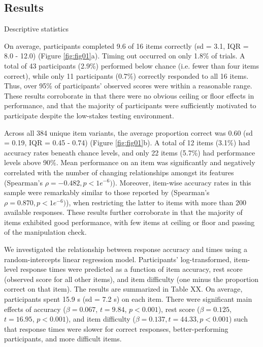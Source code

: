 \documentclass[a4paper,man,natbib]{apa6}
\makeatletter
\renewcommand{\subsubsection}{\@startsection{subsubsection}{3}
  {\z@}%
  {\b@level@two@skip}{\e@level@two@skip}%
  {\normalfont\normalsize\bfseries}}
\makeatother
\begin{document}
\subsection{Results}

\subsubsection{Descriptive statistics}

On average, participants completed 9.6 of 16 items correctly (sd = 3.1, IQR = 8.0 - 12.0) (Figure \ref{fig:fig01}a). Timing out occurred on only 1.8\% of trials. A total of 43 participants (2.9\%) performed below chance (i.e. fewer than four items correct), while only 11 participants (0.7\%) correctly responded to all 16 items. Thus, over 95\% of participants' observed scores were within a reasonable range. These results corroborate \cite{chierchia2019matrix} in that there were no obvious ceiling or floor effects in performance, and that the majority of participants were sufficiently motivated to participate despite the low-stakes testing environment.  

Across all 384 unique item variants, the average proportion correct was 0.60 (sd = 0.19, IQR = 0.45 - 0.74) (Figure \ref{fig:fig01}b). A total of 12 items (3.1\%) had accuracy rates beneath chance levels, and only 22 items (5.7\%) had performance levels above 90\%. Mean performance on an item was significantly and negatively correlated with the number of changing relationships amongst its features (Spearman's $\rho = -0.482, p < 1e^{-6})$). Moreover, item-wise accuracy rates in this sample were remarkably similar to those reported by \cite{chierchia2019matrix} (Spearman's $\rho = 0.870, p < 1e^{-6})$), when restricting the latter to items with more than 200 available responses. These results further corroborate \cite{chierchia2019matrix} in that the majority of items exhibited good performance, with few items at ceiling or floor and passing of the manipulation check. 

We investigated the relationship between response accuracy and times using a random-intercepts linear regression model. Participants' log-transformed, item-level response times were predicted as a function of item accuracy, rest score (observed score for all other items), and item difficulty (one minus the proportion correct on that item). The results are summarized in Table XX. On average, participants spent 15.9 s (sd = 7.2 s) on each item. There were significant main effects of accuracy ($\beta = 0.067$, $t = 9.84$, $p < 0.001$), rest score ($\beta = 0.125$, $t = 16.95$, $p < 0.001$), and item difficulty ($\beta = 0.137, t = 44.33, p < 0.001$) such that response times were slower for correct responses, better-performing participants, and more difficult items.
\end{document}
